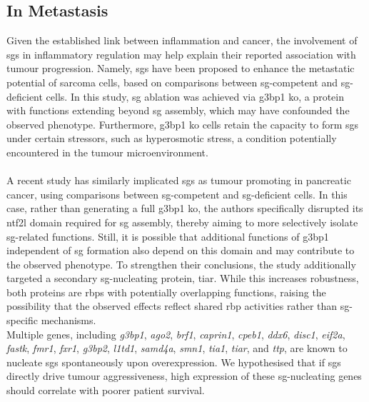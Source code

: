 \subsection{In Metastasis}
Given the established link between inflammation and cancer\cite{turizo-smith_inflammation_2024}, the involvement of \glspl{sg} in inflammatory regulation may help explain their reported association with tumour progression. Namely, \glspl{sg} have been proposed to enhance the metastatic potential of sarcoma cells\cite{somasekharan_yb-1_2015}, based on comparisons between \gls{sg}-competent and \gls{sg}-deficient cells. In this study, \gls{sg} ablation was achieved via \gls{g3bp1} \gls{ko}, a protein with functions extending beyond \gls{sg} assembly, which may have confounded the observed phenotype. Furthermore, \gls{g3bp1} \gls{ko} cells retain the capacity to form \glspl{sg} under certain stressors, such as hyperosmotic stress\cite{matheny_rna_2021, matheny_corrigendum_2023}, a condition potentially encountered in the tumour microenvironment.
\\
\\
A recent study has similarly implicated \glspl{sg} as tumour promoting in pancreatic cancer, using comparisons between \gls{sg}-competent and \gls{sg}-deficient cells\cite{fonteneau_stress_2022}. In this case, rather than generating a full \gls{g3bp1} \gls{ko}, the authors specifically disrupted its \gls{ntf2l} domain required for \gls{sg} assembly, thereby aiming to more selectively isolate \gls{sg}-related functions. Still, it is possible that additional functions of \gls{g3bp1} independent of \gls{sg} formation also depend on this domain and may contribute to the observed phenotype. To strengthen their conclusions, the study additionally targeted a secondary \gls{sg}-nucleating protein, \gls{tiar}. While this increases robustness, both proteins are \glspl{rbp} with potentially overlapping functions, raising the possibility that the observed effects reflect shared \gls{rbp} activities rather than \gls{sg}-specific mechanisms.
\\
\linebreak
\noindent
Multiple genes, including \textit{\gls{g3bp1}}\cite{tourriere_rasgap-associated_2023}, \textit{\gls{ago2}}\cite{leung_quantitative_2006}, \textit{\gls{brf1}}\cite{stoecklin_mk2induced_2004}, \textit{\gls{caprin1}}\cite{solomon_distinct_2007}, \textit{\gls{cpeb1}}\cite{wilczynska_translational_2005}, \textit{\gls{ddx6}}\cite{wilczynska_translational_2005}, \textit{\gls{disc1}}\cite{ogawa_functional_2005}, \textit{\gls{eif2a}}\cite{kedersha_rna-binding_1999}, \textit{\gls{fastk}}\cite{kedersha_stress_2005}, \textit{\gls{fmr1}}\cite{mazroui_trapping_2002}, \textit{\gls{fxr1}}\cite{mazroui_trapping_2002}, \textit{\gls{g3bp2}}\cite{tourriere_rasgap-associated_2023}, \textit{\gls{l1td1}}\cite{goodier_line-1_2007}, \textit{\gls{samd4a}}\cite{baez_mammalian_2005}, \textit{\gls{smn1}}\cite{hua_survival_2004}, \textit{\gls{tia1}}\cite{gilks_stress_2004}, \textit{\gls{tiar}}\cite{gilks_stress_2004}, and \textit{\gls{ttp}}\cite{stoecklin_mk2induced_2004}, are known to nucleate \glspl{sg} spontaneously upon overexpression\cite{anderson_stress_2008}. We hypothesised that if \gls{sg}s directly drive tumour aggressiveness, high expression of these \gls{sg}-nucleating genes should correlate with poorer patient survival.
